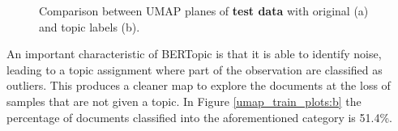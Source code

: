 \documentclass[a4paper]{article}
\begin{document}
\begin{figure}[H]
  \centering
  \caption{Comparison between UMAP planes of \textbf{test data} with original (a) and topic labels (b).}
  \label{umap_test_plots}
\end{figure}

An important characteristic of BERTopic is that it is able to identify noise, leading to a topic assignment where part of the observation are classified as outliers. This produces a cleaner map to explore the documents at the loss of samples that are not given a topic. In Figure \ref{umap_train_plots:b} the percentage of documents classified into the aforementioned category is 51.4\%.
\end{document}
